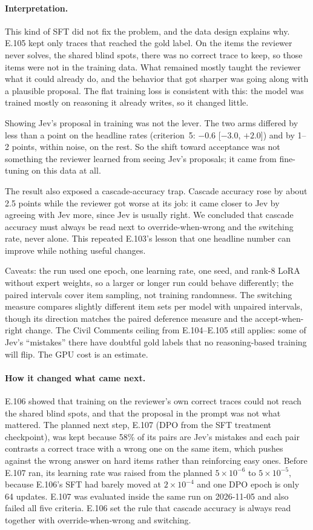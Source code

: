 \documentclass[11pt]{article}
\renewcommand{\_}{\origunderscore\allowbreak}
\begin{document}
\paragraph{Interpretation.}
This kind of SFT did not fix the problem, and the data design explains why. E.105 kept only traces that reached the gold label. On the items the reviewer never solves, the shared blind spots, there was no correct trace to keep, so those items were not in the training data. What remained mostly taught the reviewer what it could already do, and the behavior that got sharper was going along with a plausible proposal. The flat training loss is consistent with this: the model was trained mostly on reasoning it already writes, so it changed little.

Showing Jev's proposal in training was not the lever. The two arms differed by less than a point on the headline rates (criterion~5: $-0.6$ [$-3.0$, $+2.0$]) and by 1--2 points, within noise, on the rest. So the shift toward acceptance was not something the reviewer learned from seeing Jev's proposals; it came from fine-tuning on this data at all.

The result also exposed a cascade-accuracy trap. Cascade accuracy rose by about 2.5 points while the reviewer got worse at its job: it came closer to Jev by agreeing with Jev more, since Jev is usually right. We concluded that cascade accuracy must always be read next to override-when-wrong and the switching rate, never alone. This repeated E.103's lesson that one headline number can improve while nothing useful changes.

Caveats: the run used one epoch, one learning rate, one seed, and rank-8 LoRA without expert weights, so a larger or longer run could behave differently; the paired intervals cover item sampling, not training randomness. The switching measure compares slightly different item sets per model with unpaired intervals, though its direction matches the paired deference measure and the accept-when-right change. The Civil Comments ceiling from E.104--E.105 still applies: some of Jev's ``mistakes'' there have doubtful gold labels that no reasoning-based training will flip. The GPU cost is an estimate.

\paragraph{How it changed what came next.}
E.106 showed that training on the reviewer's own correct traces could not reach the shared blind spots, and that the proposal in the prompt was not what mattered. The planned next step, E.107 (DPO from the SFT treatment checkpoint), was kept because 58\% of its pairs are Jev's mistakes and each pair contrasts a correct trace with a wrong one on the same item, which pushes against the wrong answer on hard items rather than reinforcing easy ones. Before E.107 ran, its learning rate was raised from the planned $5\times10^{-6}$ to $5\times10^{-5}$, because E.106's SFT had barely moved at $2\times10^{-4}$ and one DPO epoch is only 64 updates. E.107 was evaluated inside the same run on 2026-11-05 and also failed all five criteria. E.106 set the rule that cascade accuracy is always read together with override-when-wrong and switching.
\end{document}
